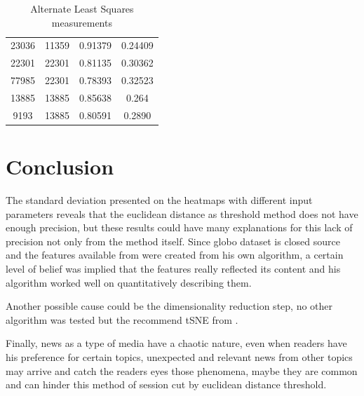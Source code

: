 \documentclass[ecp,tc,english]{iiufrgs}
\begin{document}
\begin{table}[H]
\begin{tabular}{ |c|c|c|c| }
                23036 & 11359 & 0.91379 & 0.24409 \\
                \rowcolor[RGB]{220,220,220}                
                22301 & 22301 & 0.81135 & 0.30362 \\
                \rowcolor[RGB]{220,220,220}                
                77985 & 22301 & 0.78393 & 0.32523 \\
                13885 & 13885 & 0.85638 & 0.264 \\
                9193 & 13885 & 0.80591 & 0.2890 \\
                \hline
            \end{tabular}
            \caption{Alternate Least Squares measurements}
            \label{tab:alternate_least_squares_metrics}
        \end{table}


\chapter{Conclusion}
The standard deviation presented on the heatmaps with different input parameters reveals that the euclidean distance as threshold method does not have enough precision, but these results could have many explanations for this lack of precision not only from the method itself. Since globo dataset is closed source and the features available from \cite{deSouzaPereiraMoreira:2018:CDL:3240323.3240331} were created from his own algorithm, a certain level of belief was implied that the features really reflected its content and his algorithm worked well on quantitatively describing them.

Another possible cause could be the dimensionality reduction step, no other algorithm was tested but the recommend tSNE from \cite{deSouzaPereiraMoreira:2018:CDL:3240323.3240331}.

Finally, news as a type of media have a chaotic nature, even when readers have his preference for certain topics, unexpected and relevant news from other topics may arrive and catch the readers eyes those phenomena, maybe they are common and can hinder this method of session cut by euclidean distance threshold. 



\end{document}
